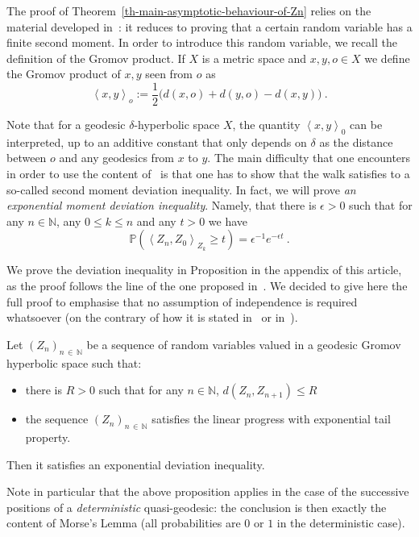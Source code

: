 \documentclass[AHL,Unicode,longabstracts,published]{cedram}
\newcommand{\bP}{\mathbb{P}}
\newcommand{\NN}{\mathbb{N}}
\begin{document}
The proof of Theorem~\ref{th-main-asymptotic-behaviour-of-Zn} relies on the material developed in~\cite{artmathieusisto}: it reduces to proving that a certain random variable has a finite second moment. In order to introduce this random variable, we recall the definition of the Gromov product. If $X$ is a metric space and $x,y,o \in X$ we define the Gromov product of $x,y$ seen from $o$ as
\[
\left\langle x,y \right\rangle_o := \frac{1}{2} \big(d(x,o) + d(y,o) - d(x,y) \big) \ .
\]

Note that for a geodesic $\delta$-hyperbolic space $X$, the quantity $\left<x,y \right>_0$ can be interpreted, up to an additive constant that only depends on $\delta$ as the distance between $o$ and any geodesics from $x$ to $y$. The main difficulty that one encounters in order to use the content of~\cite{artmathieusisto} is that one has to show that the walk satisfies to a so-called second moment deviation inequality. In fact, we will prove \emph{an exponential moment deviation inequality}. Namely, that there is $\epsilon > 0$ such that for any $ n \in \NN$, any $0 \le k \le n$ and any $t > 0$ we have
\[
\bP\left(\left\langle Z_n,Z_0 \right\rangle_{Z_k} \geq t\right) = \epsilon^{-1} e^{-\epsilon t} \ .
\]

We prove the deviation inequality in Proposition in the appendix of this article, as the proof follows the line of the one proposed in~\cite{artmathieusisto}. We decided to give here the full proof to emphasise that no assumption of independence is required whatsoever (on the contrary of how it is stated in~\cite{artmathieusisto} or in~\cite{artpierremoilargedev}).

\begin{prop}\label{prop.morseprobabilistic}
Let $(Z_n)_{n\,\in\,\NN}$ be a sequence of random variables valued in a geodesic Gromov hyperbolic space such that:
\begin{itemize}
\item there is $R > 0$ such that for any $n \in \NN$, $d(Z_n, Z_{n+1}) \le R$
\item the sequence $(Z_n)_{n\,\in\,\NN}$ satisfies the linear progress with exponential tail property.
\end{itemize}
Then it satisfies an exponential deviation inequality.
\end{prop}

Note in particular that the above proposition applies in the case of the successive positions of a \emph{deterministic} quasi-geodesic: the conclusion is then exactly the content of Morse's Lemma (all probabilities are $0$ or $1$ in the deterministic case). 
\end{document}
